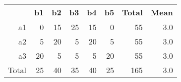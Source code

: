  \begin{center}
 \begin{tabular}{|r|rrrrr|rr|}
  \hline
   & b1 & b2 & b3 & b4 & b5 & Total & Mean \\ 
  \hline
  a1 & 0 & 15 & 25 & 15 & 0 & 55 & 3.0 \\ 
  a2 & 5 & 20 & 5 & 20 & 5 & 55 & 3.0 \\ 
  a3 & 20 & 5 & 5 & 5 & 20 & 55 & 3.0 \\ 
  \hline
  Total & 25 & 40 & 35 & 40 & 25 & 165 & 3.0\\ 
  \hline
 \end{tabular}
 \end{center}
